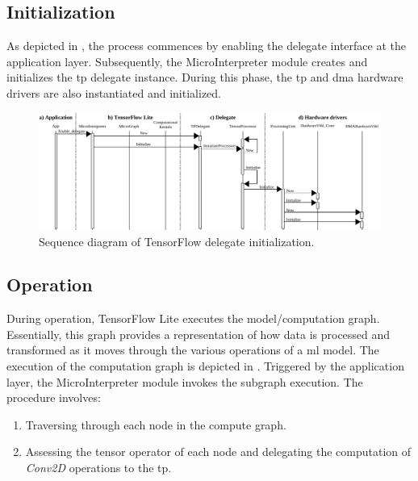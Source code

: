 \subsection{Initialization}

As depicted in , the process commences by enabling the delegate interface at the application layer. Subsequently, the MicroInterpreter module creates and initializes the \gls{tp} delegate instance. During this phase, the \gls{tp} and \gls{dma} hardware drivers are also instantiated and initialized.

\begin{figure}[h!]
	\centering
	\includegraphics[width=\textwidth]{./figures/sequence_tfl_delegate_initialization.pdf}
	\caption{Sequence diagram of TensorFlow delegate initialization.}
	\label{fig:sw_tf_delegate_initialize}
\end{figure}
\FloatBarrier
\subsection{Operation}

During operation, TensorFlow Lite executes the model/computation graph. Essentially, this graph provides a representation of how data is processed and transformed as it moves through the various operations of a \gls{ml} model. The execution of the computation graph is depicted in . Triggered by the application layer, the MicroInterpreter module invokes the subgraph execution. The procedure involves:

\begin{enumerate}
	\item Traversing through each node in the compute graph.
	\item Assessing the tensor operator of each node and delegating the computation of \textit{Conv2D} operations to the \gls{tp}.
\end{enumerate}

